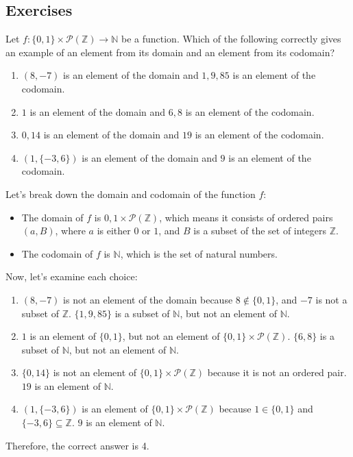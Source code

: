 \subsection{Exercises}

\begin{exercise}
	Let $f : \{0, 1\} \times \mathcal{P}(\mathbb{Z}) \to \mathbb{N}$ be a function. Which of the following correctly gives an example of an element from its domain and an element from its codomain?
	\begin{enumerate}
		\item $(8, -7)$ is an element of the domain and ${1, 9, 85}$ is an element of the codomain.
		\item $1$ is an element of the domain and ${6, 8}$ is an element of the codomain.
		\item ${0, 14}$ is an element of the domain and $19$ is an element of the codomain.
		\item $(1, \{-3, 6\})$ is an element of the domain and $9$ is an element of the codomain.
	\end{enumerate}
\end{exercise}
\begin{solution}
	Let's break down the domain and codomain of the function $f$:
	
	\begin{itemize}
		\item The domain of $f$ is ${0, 1} \times \mathcal{P}(\mathbb{Z})$, which means it consists of ordered pairs $(a, B)$, where $a$ is either $0$ or $1$, and $B$ is a subset of the set of integers $\mathbb{Z}$.
		\item The codomain of $f$ is $\mathbb{N}$, which is the set of natural numbers.
	\end{itemize}
	
	Now, let's examine each choice:
	
	\begin{enumerate}
		\item $(8, -7)$ is not an element of the domain because $8 \notin \{0, 1\}$, and $-7$ is not a subset of $\mathbb{Z}$. $\{1, 9, 85\}$ is a subset of $\mathbb{N}$, but not an element of $\mathbb{N}$.
		\item $1$ is an element of $\{0, 1\}$, but not an element of $\{0, 1\} \times \mathcal{P}(\mathbb{Z})$. $\{6, 8\}$ is a subset of $\mathbb{N}$, but not an element of $\mathbb{N}$.
		\item $\{0, 14\}$ is not an element of $\{0, 1\} \times \mathcal{P}(\mathbb{Z})$ because it is not an ordered pair. $19$ is an element of $\mathbb{N}$.
		\item $(1, \{-3, 6\})$ is an element of $\{0, 1\} \times \mathcal{P}(\mathbb{Z})$ because $1 \in \{0, 1\}$ and $\{-3, 6\} \subseteq \mathbb{Z}$. $9$ is an element of $\mathbb{N}$.
	\end{enumerate}
	
	Therefore, the correct answer is 4.
\end{solution}
